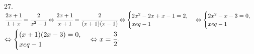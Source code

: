 27. $\cfrac{2x+1}{1+x}=\cfrac{2}{x^2-1}\Leftrightarrow\cfrac{2x+1}{x+1}=\cfrac{2}{(x+1)(x-1)}\Leftrightarrow \begin{cases} 2x^2-2x+x-1=2,\\ x
eq-1\end{cases}
\Leftrightarrow \begin{cases} 2x^2-x-3=0,\\ x
eq-1\end{cases}$\\$\Leftrightarrow \begin{cases} (x+1)(2x-3)=0,\\ x
eq-1\end{cases}\Leftrightarrow x=\cfrac{3}{2}.$\\

